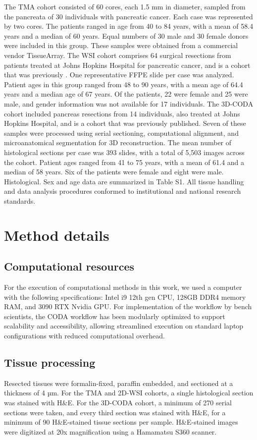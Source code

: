 \begin{refsection}
    The TMA cohort consisted of 60 cores, each 1.5 mm in diameter, sampled from the pancreata of 30 individuals with pancreatic cancer. Each case was represented by two cores. The patients ranged in age from 40 to 84 years, with a mean of 58.4 years and a median of 60 years. Equal numbers of 30 male and 30 female donors were included in this group. These samples were obtained from a commercial vendor TissueArray. The WSI cohort comprises 64 surgical resections from patients treated at Johns Hopkins Hospital for pancreatic cancer, and is a cohort that was previously \cite{Fujikura2020Intraductal}. One representative FFPE slide per case was analyzed. Patient ages in this group ranged from 48 to 90 years, with a mean age of 64.4 years and a median age of 67 years. Of the patients, 22 were female and 25 were male, and gender information was not available for 17 individuals. The 3D-CODA cohort included pancreas resections from 14 individuals, also treated at Johns Hopkins Hospital, and is a cohort that was previously published\cite{Kiemen2022CODA,Hong2020Three}. Seven of these samples were processed using serial sectioning, computational alignment, and microanatomical segmentation for 3D reconstruction. The mean number of histological sections per case was 393 slides, with a total of 5,503 images across the cohort. Patient ages ranged from 41 to 75 years, with a mean of 61.4 and a median of 58 years. Six of the patients were female and eight were male. Histological. Sex and age data are summarized in Table S1. All tissue handling and data analysis procedures conformed to institutional and national research standards.
    
    \section{Method details}
    \subsection{Computational resources}
    For the execution of computational methods in this work, we used a computer with the following specifications: Intel i9 12th gen CPU, 128GB DDR4 memory RAM, and 3090 RTX Nvidia GPU. For implementation of the workflow by bench scientists, the CODA workflow has been modularly optimized to support scalability and accessibility, allowing streamlined execution on standard laptop configurations with reduced computational overhead\cite{Matos2025CODAvision}. 
    
    \subsection{Tissue processing}
    Resected tissues were formalin-fixed, paraffin embedded, and sectioned at a thickness of 4 µm. For the TMA and 2D-WSI cohorts, a single histological section was stained with H\&E. For the 3D-CODA cohort, a minimum of 270 serial sections were taken, and every third section was stained with H\&E, for a minimum of 90 H\&E-stained tissue sections per sample. H\&E-stained images were digitized at 20x magnification using a Hamamatsu S360 scanner.
    

\end{refsection}
